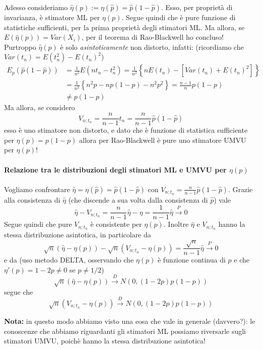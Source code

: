 Adesso consideriamo $\hat{\eta}(p):=\eta(\hat{p}) = \hat{p} (1 - \hat{p})$. Esso, per proprietà di invarianza, è stimatore ML per $\eta(p)$. Segue quindi che è pure funzione di statistiche sufficienti, per la prima proprietà degli stimatori ML. Ma allora, se $E(\hat{\eta}(p)) = Var(X_i)$, per il teorema di Rao-Blackwell ho concluso! 
Purtroppo $\hat{\eta}(p)$ è solo \textit{asintoticamente} non distorto, infatti: (ricordiamo che $Var(t_n)=E(t_n^2) - E(t_n)^2$)
\begin{align*}
E_p(\hat{p}(1 - \hat{p}))  &= \frac{1}{n^2} E (n t_n - t_n^2) 
							= \frac{1}{n^2} \left\{ nE(t_n) - [ Var(t_n) + E(t_n)^2 ] \right\}
						\\ &= \frac{1}{n^2} \left\{ n^2p - np(1-p) -n^2p^2 \right\}
							= \frac{n-1}{n}p(1-p) 
							\\ & \neq p(1-p)
\end{align*}
Ma allora, se considero $$V_{n;t_n} = \frac{n}{n-1} t_n = \frac{n}{n-1} \hat{p}(1 - \hat{p})$$
esso è uno stimatore non distorto, e dato che è funzione di statistica sufficiente per $\eta(p) = p(1-p)$ allora per Rao-Blackwell è pure uno stimatore UMVU per $\eta(p)$!\\
\\
\textbf{Relazione tra le distribuzioni degli stimatori ML e UMVU per $\eta(p)$}\\
\\
Vogliamo confrontare $\hat{\eta} = \eta(\hat{p})=\hat{p}(1 - \hat{p})$ con $V_{n:t_n} = \frac{n}{n-1}\hat{p}(1 - \hat{p})$.
Grazie alla consistenza di $\hat{\eta}$ (che discende a sua volta dalla consistenza di $\hat{p}$) vale
$$\hat{\eta} - V_{n;t_n} = \frac{n}{n-1} \hat{\eta} - \hat{\eta} = \frac{1}{n-1} \hat{\eta} \stackrel{P}{\longrightarrow} 0$$
Segue quindi che pure $V_{n;t_n}$ è consistente per $\eta(p)$.
Inoltre $\hat{\eta}$ e $V_{n;t_n}$ hanno la stessa distribuzione asintotica, in particolare da
$$\sqrt{n}(\hat{\eta} - \eta(p)) - \sqrt{n}(V_{n;t_n} - \eta(p)) = \frac{\sqrt{n}}{n - 1} \hat{\eta} \stackrel{P}{\to} 0$$
e da (uso metodo DELTA, osservando che $\eta(p)$ è funzione continua di $p$  e che $\eta' (p) = 1- 2p \neq 0$ se $p \neq 1/2$)
$$\sqrt{n}(\hat{\eta} - \eta(p)) \stackrel{D}{\to} N(0, (1- 2p)p (1-p))$$
segue che
$$\sqrt{n}(V_{n;t_n} - \eta(p)) \stackrel{D}{\to} N(0, (1- 2p)p (1-p))$$

\textbf{Nota:} in questo modo abbiamo visto una cosa che vale in generale (davvero?): le conoscenze che abbiamo riguardanti gli stimatori ML possiamo riversarle sugli stimatori UMVU, poichè hanno la stessa distribuzione asintotica!

